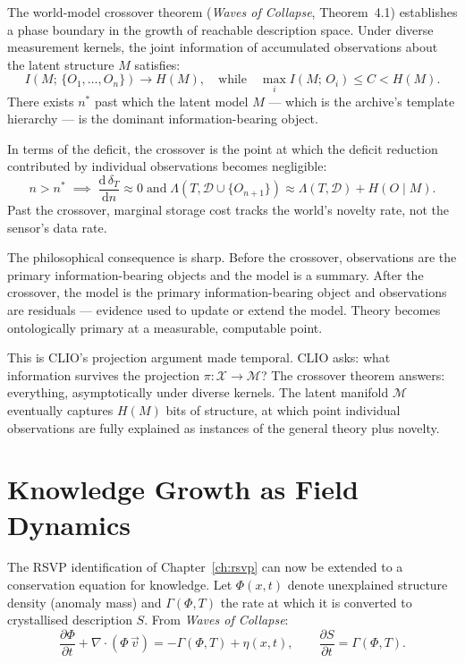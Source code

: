 \documentclass[11pt, a4paper, openany]{book}
\theoremstyle{plain}
\theoremstyle{definition}
\theoremstyle{remark}
\begin{document}
The world-model crossover theorem (\emph{Waves of Collapse}, Theorem~4.1)
establishes a phase boundary in the growth of reachable description space.
Under diverse measurement kernels, the joint information of accumulated
observations about the latent structure $M$ satisfies:
\[
  I(M;\, \{O_1, \ldots, O_n\}) \to H(M),
  \quad\text{while}\quad
  \max_i I(M;\, O_i) \leq C < H(M).
\]
There exists $n^*$ past which the latent model $M$ --- which is the archive's
template hierarchy --- is the dominant information-bearing object.

In terms of the deficit, the crossover is the point at which the deficit
reduction contributed by individual observations becomes negligible:
\[
  n > n^* \;\implies\;
  \frac{\mathrm{d}\,\delta_T}{\mathrm{d}n} \approx 0
  \;\text{and}\;
  \Lambda(T, \mathcal{D} \cup \{O_{n+1}\}) \approx \Lambda(T, \mathcal{D}) + H(O \mid M).
\]
Past the crossover, marginal storage cost tracks the world's novelty rate,
not the sensor's data rate.

The philosophical consequence is sharp.
Before the crossover, observations are the primary information-bearing objects
and the model is a summary.
After the crossover, the model is the primary information-bearing object
and observations are residuals --- evidence used to update or extend the model.
Theory becomes ontologically primary at a measurable, computable point.

This is CLIO's projection argument made temporal.
CLIO asks: what information survives the projection $\pi : \mathcal{X} \to \mathcal{M}$?
The crossover theorem answers: everything, asymptotically under diverse kernels.
The latent manifold $\mathcal{M}$ eventually captures $H(M)$ bits of structure,
at which point individual observations are fully explained as instances
of the general theory plus novelty.

\section{Knowledge Growth as Field Dynamics}

The RSVP identification of Chapter~\ref{ch:rsvp} can now be extended to
a conservation equation for knowledge.
Let $\Phi(x, t)$ denote unexplained structure density (anomaly mass) and
$\Gamma(\Phi, T)$ the rate at which it is converted to crystallised description $S$.
From \emph{Waves of Collapse}:
\[
  \frac{\partial \Phi}{\partial t} + \nabla \cdot (\Phi\, \vec{v})
  = -\Gamma(\Phi, T) + \eta(x, t),
  \qquad
  \frac{\partial S}{\partial t} = \Gamma(\Phi, T).
\]
\end{document}
